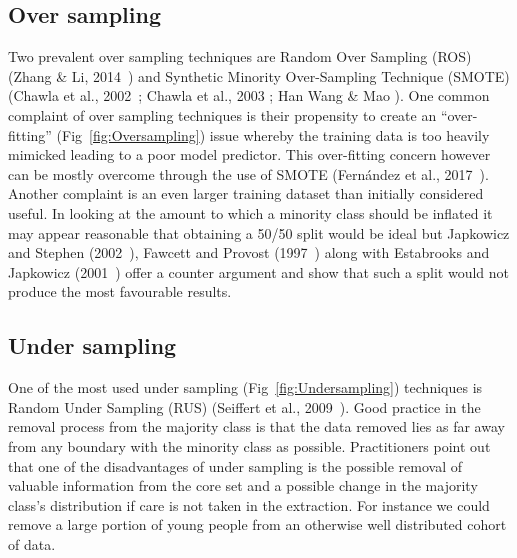 \subsection{Over sampling}\label{subsec:OverSampling}
Two prevalent over sampling techniques are Random Over Sampling (ROS) (Zhang \& Li, 2014~\cite{zhang2014rwo}) and Synthetic Minority Over-Sampling Technique (SMOTE)  (Chawla et al., 2002~\cite{chawla2002smote}; Chawla et al., 2003 \cite{chawla2003smoteboost}; Han Wang \& Mao \cite{han2005borderline}). One common complaint of over sampling techniques is their propensity to create an ``over-fitting'' (Fig~\ref{fig:Oversampling}) issue whereby the training data is too heavily mimicked leading to a poor model predictor. This over-fitting concern however can be mostly overcome through the use of SMOTE (Fern\'{a}ndez et al., 2017~\cite{fernandez2017insight}). Another complaint is an even larger training dataset than initially considered useful. In looking at the amount to which a minority class should be inflated it may appear reasonable that obtaining a 50/50 split would be ideal but Japkowicz and Stephen (2002~\cite{Japkowicz2002}), Fawcett and Provost (1997~\cite{fawcett1997adaptive}) along with Estabrooks and Japkowicz (2001~\cite{estabrooks2001mixture}) offer a counter argument and show that such a split would not produce the most favourable results.



\subsection{Under sampling}\label{subsec:UnderSampling}
One of the most used under sampling (Fig~\ref{fig:Undersampling}) techniques is Random Under Sampling (RUS) (Seiffert et al., 2009~\cite{seiffert2009rusboost}). Good practice in the removal process from the majority class is that the data removed lies as far away from any boundary with the minority class as possible. Practitioners point out that one of the disadvantages of under sampling is the possible removal of valuable information from the core set and a possible change in the majority class's distribution if care is not taken in the extraction. For instance we could remove a large portion of young people from an otherwise well distributed cohort of data. 



